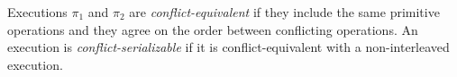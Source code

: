 \documentclass{article}
\begin{document}


Executions $\pi_1$ and $\pi_2$ are \emph{conflict-equivalent} 
if they include the same primitive operations and they 
agree on the order between conflicting operations. 
An execution is \emph{conflict-serializable} if it is 
conflict-equivalent with a non-interleaved execution.



\end{document}
